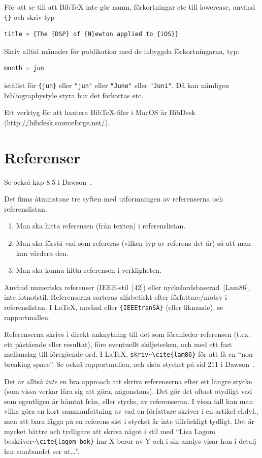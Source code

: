 \documentclass[swedish, a4paper,12pt]{article}
\begin{document}
För att se till att BibTeX inte gör namn, förkortningar etc till lowercase, använd \verb|{}| och skriv typ
\begin{verbatim}
title = {The {DSP} of {N}ewton applied to {iOS}}
\end{verbatim}

Skriv alltid månader för publikation med de inbyggda förkortningarna, typ:
\begin{verbatim}
month = jun
\end{verbatim}
istället för \verb|{jun}| eller \verb|"jun"| eller \verb|"June"| eller \verb|"Juni"|. Då kan nämligen bibliographystyle styra hur det förkortas etc.

Ett verktyg för att hantera BibTeX-filer i MacOS är BibDesk (\url{http://bibdesk.sourceforge.net/}).


\section{Referenser}
\label{sec:referenser}

Se också kap 8.5 i Dawson~\cite{dawson:projects-in-computing}.

Det finns åtminstone tre syften med utformningen av referenserna och referenslistan.
\begin{enumerate}
\item Man ska hitta referensen (från texten) i referenslistan.
\item Man ska förstå vad som refereras (vilken typ av referens det är) så att man kan värdera den.
\item Man ska kunna hitta referensen i verkligheten.
\end{enumerate}

Använd numeriska referenser (IEEE-stil~[42]) eller nyckelordsbaserad~[Lam86], inte fotnotstil. Referenserna sorteras alfabetiskt efter författare/motsv i referenslistan. I LaTeX, använd \verb|| eller \verb|{IEEEtranSA}| (eller liknande), se rapportmallen.

Referenserna skrivs i direkt anknytning till det som föranleder referensen (t.ex. ett påstående eller resultat), före eventuellt skiljetecken, och med ett fast mellanslag till föregående ord. I LaTeX, \verb|skriv~\cite{lam86}| för att få en ``non-breaking space''. Se också rapportmallen, och sista stycket på sid 211 i Dawson~\cite{dawson:projects-in-computing}.

Det är alltså \emph{inte} en bra approach att skriva referenserna efter ett längre stycke (som vissa verkar lära sig att göra, någonstans). Det gör det oftast otydligt vad som egentligen är hämtat från, eller styrks, av referenserna. I vissa fall kan man vilka göra en kort sammanfattning av vad en författare skriver i en artikel el.dyl., men att bara lägga på en referens sist i stycket är inte tillräckligt tydligt. Det är mycket bättre och tydligare att skriva något i stil med ``Lisa Lagom beskriver\verb|~\cite{lagom-bok}| hur X beror av Y och i sin analys visar hon i detalj hur sambandet ser ut\ldots''.
\end{document}
